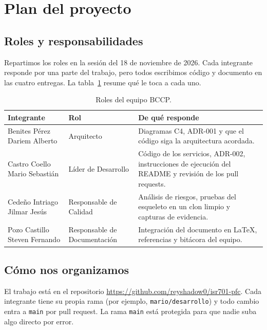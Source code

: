 \section{Plan del proyecto}
\label{sec:plan}

\subsection{Roles y responsabilidades}

Repartimos los roles en la sesión del 18 de noviembre de 2026. Cada integrante responde por una parte del trabajo, pero todos escribimos código y documento en las cuatro entregas. La tabla~\ref{tab:roles} resume qué le toca a cada uno.

\begin{table}[htbp]
  \centering
  \caption{Roles del equipo BCCP.}
  \label{tab:roles}
  \small
  \begin{tabularx}{\textwidth}{@{}>{\raggedright\arraybackslash}p{3.6cm} >{\raggedright\arraybackslash}p{2.7cm} >{\raggedright\arraybackslash}X@{}}
    \toprule
    \textbf{Integrante} & \textbf{Rol} & \textbf{De qué responde} \\
    \midrule
    Benites Pérez Dariem Alberto & Arquitecto & Diagramas C4, ADR-001 y que el código siga la arquitectura acordada. \\
    \addlinespace
    Castro Coello Mario Sebastián & Líder de Desarrollo & Código de los servicios, ADR-002, instrucciones de ejecución del README y revisión de los pull requests. \\
    \addlinespace
    Cedeño Intriago Jilmar Jesús & Responsable de Calidad & Análisis de riesgos, pruebas del esqueleto en un clon limpio y capturas de evidencia. \\
    \addlinespace
    Pozo Castillo Steven Fernando & Responsable de Documentación & Integración del documento en LaTeX, referencias y bitácora del equipo. \\
    \bottomrule
  \end{tabularx}
\end{table}

\subsection{Cómo nos organizamos}

El trabajo está en el repositorio \url{https://github.com/reyshadow0/isr701-pfc}. Cada integrante tiene su propia rama (por ejemplo, \texttt{mario/desarrollo}) y todo cambio entra a \texttt{main} por pull request. La rama \texttt{main} está protegida para que nadie suba algo directo por error.

